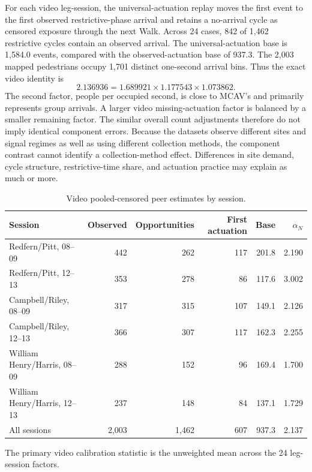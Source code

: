 \documentclass[11pt]{article}
\begin{document}
For each video leg-session, the universal-actuation replay moves the first event to the first observed restrictive-phase arrival and retains a no-arrival cycle as censored exposure through the next Walk. Across 24 cases, 842 of 1,462 restrictive cycles contain an observed arrival. The universal-actuation base is 1,584.0 events, compared with the observed-actuation base of 937.3. The 2,003 mapped pedestrians occupy 1,701 distinct one-second arrival bins. Thus the exact video identity is
\begin{equation}
2.136936=1.689921\times1.177543\times1.073862.
\end{equation}
The second factor, people per occupied second, is close to MCAV's and primarily represents group arrivals. A larger video missing-actuation factor is balanced by a smaller remaining factor. The similar overall count adjustments therefore do not imply identical component errors. Because the datasets observe different sites and signal regimes as well as using different collection methods, the component contrast cannot identify a collection-method effect. Differences in site demand, cycle structure, restrictive-time share, and actuation practice may explain as much or more.

\begin{table}[htbp]
\centering
\caption{Video pooled-censored peer estimates by session.}
\footnotesize
\begin{tabular}{@{}lrrrrr@{}}
\toprule
Session & Observed & Opportunities & First actuation & Base & \(\alpha_N\) \\
\midrule
Redfern/Pitt, 08--09 & 442 & 262 & 117 & 201.8 & 2.190 \\
Redfern/Pitt, 12--13 & 353 & 278 & 86 & 117.6 & 3.002 \\
Campbell/Riley, 08--09 & 317 & 315 & 107 & 149.1 & 2.126 \\
Campbell/Riley, 12--13 & 366 & 307 & 117 & 162.3 & 2.255 \\
William Henry/Harris, 08--09 & 288 & 152 & 96 & 169.4 & 1.700 \\
William Henry/Harris, 12--13 & 237 & 148 & 84 & 137.1 & 1.729 \\
\midrule
All sessions & 2{,}003 & 1{,}462 & 607 & 937.3 & 2.137 \\
\bottomrule
\end{tabular}
\end{table}

The primary video calibration statistic is the unweighted mean across the 24 leg-session factors.
\end{document}
